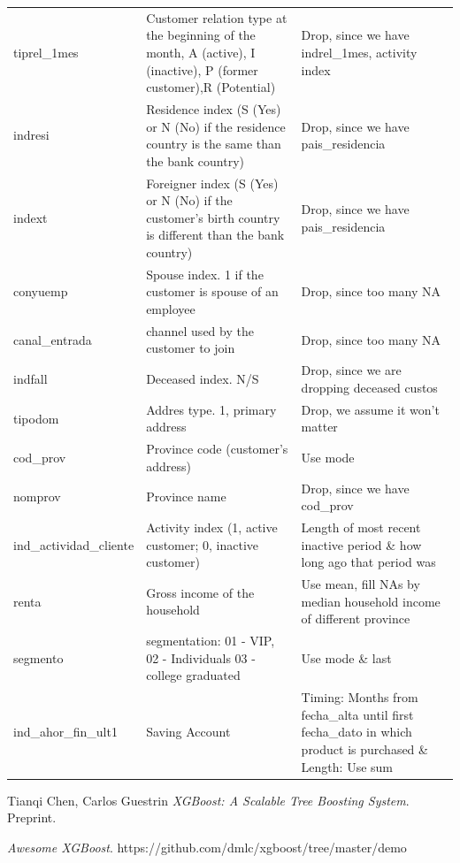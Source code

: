 \documentclass{article}
\begin{document}
\begin{spacing}{1}
\begin{large}
\begin{appendices}
\begin{longtable}{p{3cm}|p{5cm}|p{5cm}}
		tiprel\_1mes & Customer relation type at the beginning of the month, A (active), I (inactive), P (former customer),R (Potential) & Drop, since we have indrel\_1mes, activity index \\
		indresi & Residence index (S (Yes) or N (No) if the residence country is the same than the bank country) & Drop, since we have pais\_residencia \\
		indext & Foreigner index (S (Yes) or N (No) if the customer's birth country is different than the bank country) & Drop, since we have pais\_residencia \\
		conyuemp & Spouse index. 1 if the customer is spouse of an employee & Drop, since too many NA \\
		canal\_entrada & channel used by the customer to join & Drop, since too many NA \\
		indfall & Deceased index. N/S & Drop, since we are dropping deceased custos \\
		tipodom & Addres type. 1, primary address & Drop, we assume it won't matter \\
		cod\_prov & Province code (customer's address) & Use mode \\
		nomprov & Province name & Drop, since we have cod\_prov \\
		ind\_actividad\_cliente & Activity index (1, active customer; 0, inactive customer) & Length of most recent inactive period \& how long ago that period was \\
		renta & Gross income of the household & Use mean, fill NAs by median household income of different province \\
		segmento & segmentation: 01 - VIP, 02 - Individuals 03 - college graduated & Use mode \& last \\
		ind\_ahor\_fin\_ult1 & Saving Account & Timing: Months from fecha\_alta until first fecha\_dato in which product is purchased \& Length: Use sum \\
		
		
	\end{longtable}
	
\end{appendices}

\begin{thebibliography}{9}
	
	Tianqi Chen, Carlos Guestrin
	\emph{XGBoost: A Scalable Tree Boosting System}. Preprint.
	
	\emph{Awesome XGBoost}.
	https://github.com/dmlc/xgboost/tree/master/demo
	

\end{thebibliography}
\end{large}
\end{spacing}
\end{document}
